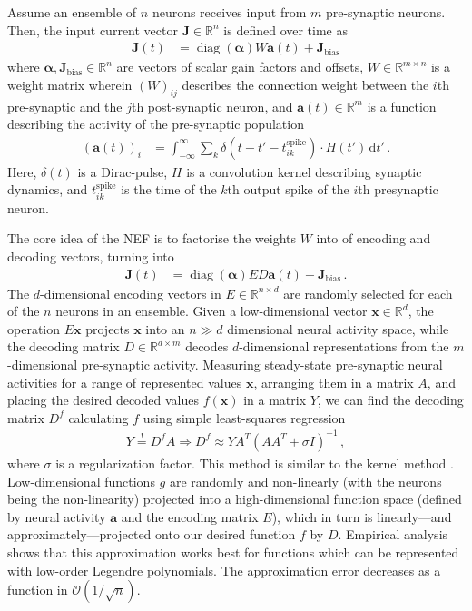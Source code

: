 \documentclass[letterpaper,10pt,conference]{ieeeconf}
\renewcommand{\vec}[1]{\bm{#1}}
\newcommand{\R}{{\mathbb{R}}}
\DeclareMathOperator{\diag}{diag}
\begin{document}
Assume an ensemble of $n$ neurons receives input from $m$ pre-synaptic neurons. Then, the input current vector $\vec J \in \mathbb{R}^n$ is defined over time as
\begin{align}
	\vec J(t)
		&= \diag(\vec \alpha) W \vec a(t) + \vec J_\mathrm{bias}
	\label{eqn:j_w}
\end{align}
where $\vec \alpha, \vec J_\mathrm{bias} \in \R^n$ are vectors of scalar gain factors and offsets, $W \in \mathbb{R}^{m \times n}$ is a weight matrix wherein $(W)_{ij}$ describes the connection weight between the $i$th pre-synaptic and the $j$th post-synaptic neuron, and $\vec a(t) \in \mathbb{R}^m$ is a function describing the activity of the pre-synaptic population
\begin{align*}
	(\vec a(t))_i &= \int_{-\infty}^\infty \sum_k \delta(t - t' - t^\mathrm{spike}_{ik}) \cdot H(t') \,\mathrm{d}t'\,.
\end{align*}
Here, $\delta(t)$ is a Dirac-pulse, $H$ is a convolution kernel describing synaptic dynamics, and $t^\mathrm{spike}_{ik}$ is the time of the $k$th output spike of the $i$th presynaptic neuron.

The core idea of the NEF is to factorise the weights $W$ into of encoding and decoding vectors, turning  into
\begin{align*}
	\vec J(t) &= \diag(\vec \alpha) E D \vec a(t) + \vec J_\mathrm{bias} \,.
\end{align*}
The $d$-dimensional encoding vectors in $E \in \R^{n \times d}$ are randomly selected for each of the $n$ neurons in an ensemble. Given a low-dimensional vector $\vec x \in \R^d$, the operation $E \vec x$ projects $\vec x$ into an $n \gg d$ dimensional neural activity space, while the decoding matrix $D \in \R^{d \times m}$ decodes $d$-dimensional representations from the $m$-dimensional pre-synaptic activity. Measuring steady-state pre-synaptic neural activities for a range of represented values $\vec x$, arranging them in a matrix $A$, and placing the desired decoded values $f(\vec x)$ in a matrix $Y$, we can find the decoding matrix $D^f$ calculating $f$ using simple least-squares regression
\begin{align*}
	Y \overset{!}= D^f A \Rightarrow D^f \approx Y A^T (A A^T + \sigma I)^{-1} \,,
\end{align*}
where $\sigma$ is a regularization factor. This method is similar to the kernel method \cite{hofmann2008kernel}. Low-dimensional functions $g$ are randomly and non-linearly (with the neurons being the non-linearity) projected into a high-dimensional function space (defined by neural activity $\vec a$ and the encoding matrix $E$), which in turn is linearly---and approximately---projected onto our desired function $f$ by $D$. Empirical analysis shows that this approximation works best for functions which can be represented with low-order Legendre polynomials. The approximation error decreases as a function in $\mathcal{O}(1 / \sqrt{n})$.
\end{document}
